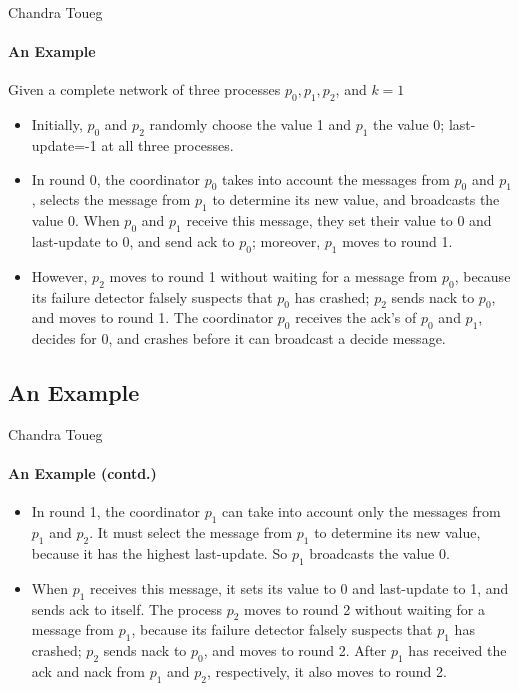 \documentclass[11pt]{beamer}              %
\begin{document}
\begin{frame}{Chandra Toueg}
\framesubtitle{An Example}
Given a complete network of three processes \(p_0, p_1, p_2\), and \(k = 1\)

\begin{itemize}
\item Initially, \(p_0\) and \(p_2\) randomly choose the value 1 and \(p_1\) the value 0; last-update=-1 at all three processes.
\item In round 0, the coordinator \(p_0\) takes into account the messages from \(p_0\) and \(p_1\), selects the message from
\(p_1\) to determine its new value, and broadcasts the value 0. When \(p_0\) and \(p_1\) receive this message, they set
their value to 0 and last-update to 0, and send ack to \(p_0\); moreover, \(p_1\) moves to round 1.
\item However, \(p_2\) moves
to round 1 without waiting for a message from \(p_0\), because its failure detector falsely suspects that \(p_0\) has
crashed; \(p_2\) sends nack to \(p_0\), and moves to round 1. The coordinator \(p_0\) receives the ack’s of \(p_0\) and \(p_1\),
decides for 0, and crashes before it can broadcast a decide message.
\end{itemize}
\end{frame}

\subsection{An Example}
\begin{frame}{Chandra Toueg}
\framesubtitle{An Example (contd.)}
\begin{itemize}
\item In round 1, the coordinator \(p_1\) can take into account only the messages from \(p_1\) and \(p_2\). It must select the
message from \(p_1\) to determine its new value, because it has the highest last-update. So \(p_1\) broadcasts the value
0. 
\item When \(p_1\) receives this message, it sets its value to 0 and last-update to 1, and sends ack to itself. The process
\(p_2\) moves to round 2 without waiting for a message from \(p_1\), because its failure detector falsely suspects that
\(p_1\) has crashed; \(p_2\) sends nack to \(p_0\), and moves to round 2. After \(p_1\) has received the ack and nack from
\(p_1\) and \(p_2\), respectively, it also moves to round 2.
\end{itemize}
\end{frame}
\end{document}
